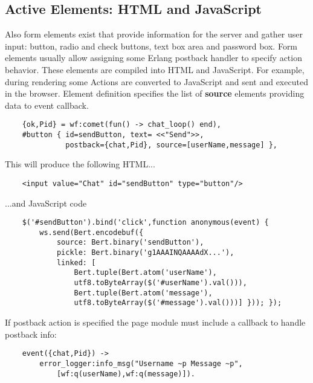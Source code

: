 \subsection{Active Elements: HTML and JavaScript}
Also form elements exist that provide information for the server
and gather user input: button, radio and check buttons, text box area and password box.
Form elements usually allow assigning some Erlang postback handler to specify action behavior.
These elements are compiled into HTML and JavaScript. For example, during rendering some
Actions are converted to JavaScript and sent and executed in the browser.
Element definition specifies the list of {\bf source} elements providing data to event callback.

\vspace{1\baselineskip}
\begin{lstlisting}
    {ok,Pid} = wf:comet(fun() -> chat_loop() end),
    #button { id=sendButton, text= <<"Send">>, 
              postback={chat,Pid}, source=[userName,message] },
\end{lstlisting}
\vspace{1\baselineskip}

This will produce the following HTML...

\vspace{1\baselineskip}
\begin{lstlisting}
    <input value="Chat" id="sendButton" type="button"/>
\end{lstlisting}
\vspace{1\baselineskip}

...and JavaScript code

\vspace{1\baselineskip}
\begin{lstlisting}
    $('#sendButton').bind('click',function anonymous(event) { 
        ws.send(Bert.encodebuf({
            source: Bert.binary('sendButton'), 
            pickle: Bert.binary('g1AAAINQAAAAdX...'),
            linked: [
                Bert.tuple(Bert.atom('userName'),
                utf8.toByteArray($('#userName').val())),
                Bert.tuple(Bert.atom('message'),
                utf8.toByteArray($('#message').val()))] })); });
\end{lstlisting}
\vspace{1\baselineskip}

If postback action is specified the page module must include a callback to handle postback info:

\vspace{1\baselineskip}
\begin{lstlisting}
    event({chat,Pid}) ->
        error_logger:info_msg("Username ~p Message ~p",
            [wf:q(userName),wf:q(message)]).
\end{lstlisting}
\vspace{1\baselineskip}


